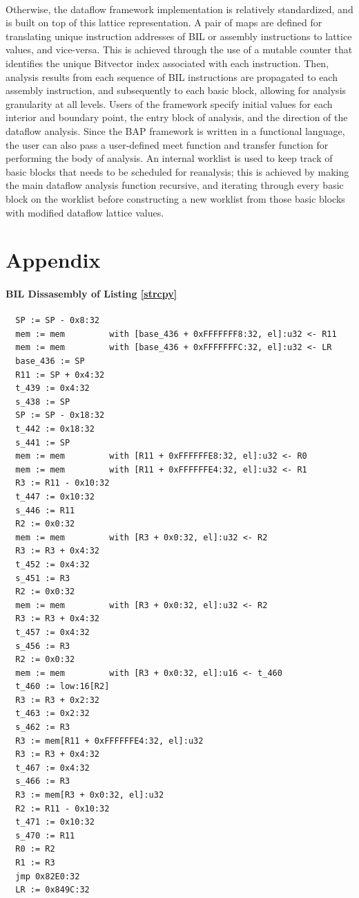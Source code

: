 \documentclass[letterpaper,11pt]{article}
\begin{document}
\paragraph{}
Otherwise, the dataflow framework implementation is relatively standardized,
and is built on top of this lattice representation. A pair of maps are defined
for translating unique instruction addresses of BIL or assembly instructions to
lattice values, and vice-versa. This is achieved through the use of a mutable
counter that identifies the unique Bitvector index associated with each
instruction. Then, analysis results from each sequence of BIL instructions are
propagated to each assembly instruction, and subsequently to each basic block,
allowing for analysis granularity at all levels. Users of the framework specify
initial values for each interior and boundary point, the entry block of
analysis, and the direction of the dataflow analysis. Since the BAP framework
is written in a functional language, the user can also pass a user-defined meet
function and transfer function for performing the body of analysis. An internal
worklist is used to keep track of basic blocks that needs to be scheduled for
reanalysis; this is achieved by making the main dataflow analysis function
recursive, and iterating through every basic block on the worklist before
constructing a new worklist from those basic blocks with modified dataflow
lattice values.

\section{Appendix}
\label{appa2}
\paragraph{BIL Dissasembly of Listing \ref{strcpy}}

\begin{verbatim}
  SP := SP - 0x8:32
  mem := mem         with [base_436 + 0xFFFFFFF8:32, el]:u32 <- R11
  mem := mem         with [base_436 + 0xFFFFFFFC:32, el]:u32 <- LR
  base_436 := SP
  R11 := SP + 0x4:32
  t_439 := 0x4:32
  s_438 := SP
  SP := SP - 0x18:32
  t_442 := 0x18:32
  s_441 := SP
  mem := mem         with [R11 + 0xFFFFFFE8:32, el]:u32 <- R0
  mem := mem         with [R11 + 0xFFFFFFE4:32, el]:u32 <- R1
  R3 := R11 - 0x10:32
  t_447 := 0x10:32
  s_446 := R11
  R2 := 0x0:32
  mem := mem         with [R3 + 0x0:32, el]:u32 <- R2
  R3 := R3 + 0x4:32
  t_452 := 0x4:32
  s_451 := R3
  R2 := 0x0:32
  mem := mem         with [R3 + 0x0:32, el]:u32 <- R2
  R3 := R3 + 0x4:32
  t_457 := 0x4:32
  s_456 := R3
  R2 := 0x0:32
  mem := mem         with [R3 + 0x0:32, el]:u16 <- t_460
  t_460 := low:16[R2]
  R3 := R3 + 0x2:32
  t_463 := 0x2:32
  s_462 := R3
  R3 := mem[R11 + 0xFFFFFFE4:32, el]:u32
  R3 := R3 + 0x4:32
  t_467 := 0x4:32
  s_466 := R3
  R3 := mem[R3 + 0x0:32, el]:u32
  R2 := R11 - 0x10:32
  t_471 := 0x10:32
  s_470 := R11
  R0 := R2
  R1 := R3
  jmp 0x82E0:32
  LR := 0x849C:32
\end{verbatim}
\end{document}
